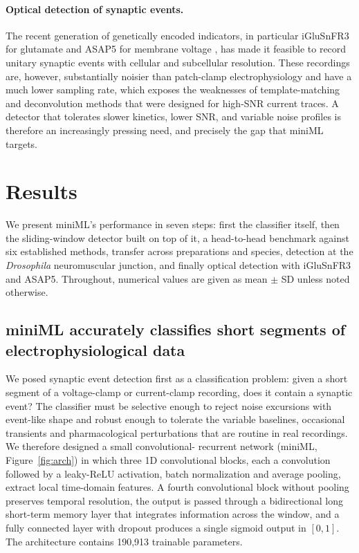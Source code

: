 \documentclass[11pt]{article}
\begin{document}
\paragraph{Optical detection of synaptic events.}
The recent generation of genetically encoded indicators, in particular
iGluSnFR3 for glutamate \citep{aggarwal2023iglusnfr3} and ASAP5 for membrane
voltage \citep{hao2024asap5}, has made it feasible to record unitary synaptic
events with cellular and subcellular resolution. These recordings are,
however, substantially noisier than patch-clamp electrophysiology and have a
much lower sampling rate, which exposes the weaknesses of template-matching
and deconvolution methods that were designed for high-SNR current traces. A
detector that tolerates slower kinetics, lower SNR, and variable noise
profiles is therefore an increasingly pressing need, and precisely the gap
that miniML targets.

\section{Results}

We present miniML's performance in seven steps: first the classifier itself,
then the sliding-window detector built on top of it, a head-to-head
benchmark against six established methods, transfer across preparations and
species, detection at the \textit{Drosophila} neuromuscular junction, and
finally optical detection with iGluSnFR3 and ASAP5. Throughout, numerical
values are given as mean $\pm$ SD unless noted otherwise.

\subsection{miniML accurately classifies short segments of electrophysiological data}

We posed synaptic event detection first as a classification problem: given a
short segment of a voltage-clamp or current-clamp recording, does it contain
a synaptic event? The classifier must be selective enough to reject noise
excursions with event-like shape and robust enough to tolerate the variable
baselines, occasional transients and pharmacological perturbations that are
routine in real recordings. We therefore designed a small convolutional-
recurrent network (miniML, Figure~\ref{fig:arch}) in which three 1D
convolutional blocks, each a convolution followed by a leaky-ReLU activation,
batch normalization \citep{ioffe2015batchnorm} and average pooling, extract
local time-domain features. A fourth convolutional block without pooling
preserves temporal resolution, the output is passed through a bidirectional
long short-term memory layer that integrates information across the window,
and a fully connected layer with dropout \citep{srivastava2014dropout}
produces a single sigmoid output in $[0,1]$. The architecture contains
190{,}913 trainable parameters.
\end{document}
